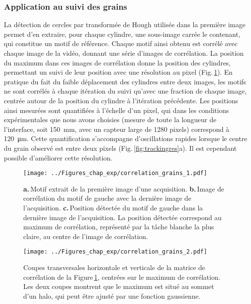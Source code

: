 \subsubsection{Application au suivi des grains}







La détection de cercles par transformée de Hough utilisée dans la première image permet d'en extraire, pour chaque cylindre, une sous-image carrée le contenant, qui constitue un motif de référence. Chaque motif ainsi obtenu est corrélé avec chaque image de la vidéo, donnant une série d'images de corrélation. La position du maximum dans ces images de corrélation donne la position des cylindres, permettant un suivi de leur position avec une résolution au pixel (Fig.\,\ref{fig:correl}). En pratique du fait du faible déplacement des cylindres entre deux images, les motifs ne sont corrélés à chaque itération du suivi qu'avec une fraction de chaque image, centrée autour de la position du cylindre à l'itération précédente. Les positions ainsi mesurées sont quantifiées à l'échelle d'un pixel, qui dans les conditions expérimentales que nous avons choisies (mesure de toute la longueur de l'interface, soit \SI{150}{\milli\meter}, avec un capteur large de 1280 pixels) correspond à \SI{120}{\micro\meter}. Cette quantification s'accompagne d'oscillations rapides lorsque le centre du grain observé est entre deux pixels (Fig.\,\ref{fig:trackingres}a). Il est cependant possible d'améliorer cette résolution.






\begin{figure}[p]
\centering	
\texttt{[image: ../Figures\_chap\_exp/correlation\_grains\_1.pdf]}
\caption[Détection des grains par PTV]{\textbf{a.}\,Motif extrait de la première image d'une acquisition. \textbf{b.}\,Image de corrélation du motif de gauche avec la dernière image de l'acquisition. \textbf{c.}\,Position détectée du motif de gauche dans la dernière image de l'acquisition. La position détectée correspond au maximum de corrélation, représenté par la tâche blanche la plus claire, au centre de l'image de corrélation.}
\label{fig:correl}
\end{figure}



\begin{figure}[p]
\centering	
\texttt{[image: ../Figures\_chap\_exp/correlation\_grains\_2.pdf]}
\caption[Profil de corrélation]{Coupes transversales horizontale et verticale de la matrice de corrélation de la Figure\,\ref{fig:correl}, centrées sur le maximum de corrélation. Les deux coupes montrent que le maximum est situé au sommet d'un halo, qui peut être ajusté par une fonction gaussienne.}
\label{fig:gausscor}
\end{figure}



